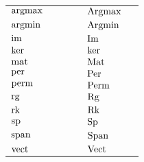 \documentclass{article}
\begin{document}
\begin{table}[H]
    \centering
    \begin{tabular}{ll ll ll}
    $\operatorname{argmax}$ & \raw{\argmax} &&& $\operatorname{Argmax}$ & \raw{\Argmax}\\
    $\operatorname{argmin}$ & \raw{\argmin} &&& $\operatorname{Argmin}$ & \raw{\Argmin}\\
    $\operatorname{im}$ & \raw{\img} &&& $\operatorname{Im}$ & \raw{\Img}\\
    $\operatorname{ker}$ & \raw{\kr} &&& $\operatorname{ker}$ & \raw{\Kr}\\
    $\operatorname{mat}$ & \raw{\mat} &&& $\operatorname{Mat}$ & \raw{\Mat}\\
    $\operatorname{per}$ & \raw{\per} &&& $\operatorname{Per}$ & \raw{\Per}\\
    $\operatorname{perm}$ & \raw{\perm} &&& $\operatorname{Perm}$ & \raw{\Perm}\\
    $\operatorname{rg}$ & \raw{\rg} &&& $\operatorname{Rg}$ & \raw{\Rg}\\
    $\operatorname{rk}$ & \raw{\rk} &&& $\operatorname{Rk}$ & \raw{\Rk}\\
    $\operatorname{sp}$ & \raw{\spc} &&& $\operatorname{Sp}$ & \raw{\Spc}\\
    $\operatorname{span}$ & \raw{\spn} &&& $\operatorname{Span}$ & \raw{\Spn}\\
    $\operatorname{vect}$ & \raw{\vect} &&& $\operatorname{Vect}$ & \raw{\Vect}\\
    \end{tabular}
\end{table}
\end{document}
